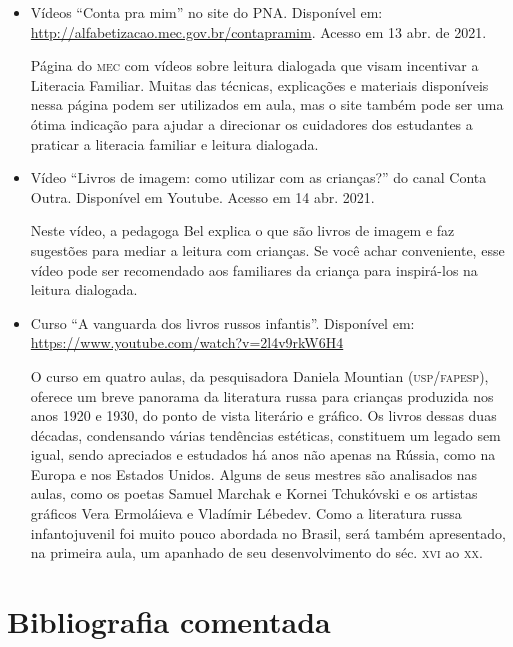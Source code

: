 \documentclass[11pt]{extarticle}
\begin{document}
\begin{itemize}
\item Vídeos “Conta pra mim” no site do PNA. Disponível em: \url{http://alfabetizacao.mec.gov.br/contapramim}. 
Acesso em 13 abr. de 2021.

Página do \textsc{mec} com vídeos sobre leitura dialogada que visam incentivar a Literacia Familiar. Muitas das 
técnicas, explicações e materiais disponíveis nessa página podem ser utilizados em aula, mas o site também 
pode ser uma ótima indicação para ajudar a direcionar os cuidadores dos estudantes a praticar 
a literacia familiar e leitura dialogada.

\item Vídeo “Livros de imagem: como utilizar com as crianças?” do canal Conta Outra. Disponível em Youtube. 
Acesso em 14 abr. 2021. 

Neste vídeo, a pedagoga Bel explica o que são livros de imagem e faz sugestões para mediar a leitura com 
crianças. Se você achar conveniente, esse vídeo pode ser recomendado aos familiares da criança 
para inspirá-los na leitura dialogada. 

\item Curso ``A vanguarda dos livros russos infantis''. Disponível em: 
\url{https://www.youtube.com/watch?v=2l4v9rkW6H4}

O curso em quatro aulas, da pesquisadora Daniela Mountian (\textsc{usp/fapesp}),
oferece um breve panorama da literatura russa para crianças produzida
nos anos 1920 e 1930, do ponto de vista literário e gráfico. Os livros
dessas duas décadas, condensando várias tendências estéticas, constituem
um legado sem igual, sendo apreciados e estudados há anos não apenas na
Rússia, como na Europa e nos Estados Unidos. Alguns de seus mestres são
analisados nas aulas, como os poetas Samuel Marchak e Kornei Tchukóvski
e os artistas gráficos Vera Ermoláieva e Vladímir Lébedev. Como a
literatura russa infantojuvenil foi muito pouco abordada no Brasil, será
também apresentado, na primeira aula, um apanhado de seu desenvolvimento
do séc. \textsc{xvi} ao \textsc{xx}.
\end{itemize}

\section{Bibliografia comentada}

\end{document}
